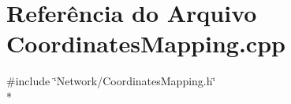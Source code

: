 \section{Referência do Arquivo Coordinates\+Mapping.\+cpp}
\label{_coordinates_mapping_8cpp}
{\ttfamily \#include \char`\"{}Network/\+Coordinates\+Mapping.\+h\char`\"{}}\\*
